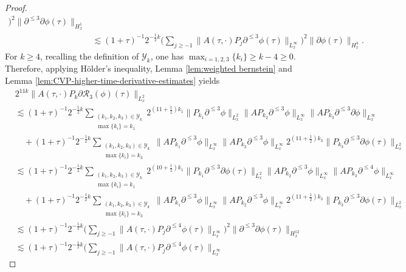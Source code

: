 \documentclass[11pt,twoside]{article}
\def\cY{\mathcal Y}
\def\p{\partial}
\def\ls{\lesssim}
\theoremstyle{plain}
\theoremstyle{definition}
\theoremstyle{assumption}
\numberwithin{equation}{section}
\begin{document}
\begin{proof}
\begin{equation}
\begin{aligned}
				\big)^2
				\|\p^{\le3}\p\phi(\tau)\|_{H^1_x}
				\\
				&\ls
				(1+\tau)^{-1}2^{-\frac12 k}
				\big(
				\sum_{j\ge-1}
				\|A(\tau,\cdot)P_j\p^{\le3}\phi(\tau)\|_{L^\infty_x}
				\big)^2
				\|\p\phi(\tau)\|_{H^4_x}.
			\end{aligned}
		\end{equation}
		For $k\ge 4$, recalling the definition of $\cY_k$, one has $\max_{i=1,2,3}\{k_i\}\ge k-4\ge 0$.
		Therefore, applying H\"older's inequality, Lemma \ref{lem:weighted bernstein} and Lemma \ref{lem:CVP-higher-time-derivative-estimates} yields
		\begin{equation}\label{eq:CVP-R3-high-frequency}
			\begin{aligned}
				&2^{11k}
				\|A(\tau,\cdot)P_k\p\mathcal R_3(\phi)(\tau)\|_{L^2_x}\\
				&\ls
				(1+\tau)^{-1}2^{-\frac12 k}
				\sum_{\substack{(k_1,k_2,k_3)\in\cY_k\\
						\max\{k_i\}=k_1}}
				2^{(11+\frac12)k_1}
				\|P_{k_1}\p^{\le3}\phi\|_{L^2_x}
				\|AP_{k_2}\p^{\le3}\phi\|_{L^\infty_x}
				\|AP_{k_3}\p^{\le3}\p\phi\|_{L^\infty_x}\\
				&\quad+
				(1+\tau)^{-1}2^{-\frac12 k}
				\sum_{\substack{(k_1,k_2,k_3)\in\cY_k\\
						\max\{k_i\}=k_3}}
				\|AP_{k_1}\p^{\le3}\phi\|_{L^\infty_x}
				\|AP_{k_2}\p^{\le3}\phi\|_{L^\infty_x}
				2^{(11+\frac12)k_3}
				\|P_{k_3}\p^{\le 3}\p\phi(\tau)\|_{L^2_x}\\
				&\ls
				(1+\tau)^{-1}2^{-\frac12 k}
				\sum_{\substack{(k_1,k_2,k_3)\in\cY_k\\
						\max\{k_i\}=k_1}}
				2^{(10+\frac12)k_1}
				\|P_{k_1}\p^{\le3}\p\phi(\tau)\|_{L^2_x}
				\|AP_{k_2}\p^{\le3}\phi\|_{L^\infty_x}
				\|AP_{k_3}\p^{\le4}\phi\|_{L^\infty_x}\\
				&\quad+
				(1+\tau)^{-1}2^{-\frac12 k}
				\sum_{\substack{(k_1,k_2,k_3)\in\cY_k\\
						\max\{k_i\}=k_3}}
				\|AP_{k_1}\p^{\le3}\phi\|_{L^\infty_x}
				\|AP_{k_2}\p^{\le3}\phi\|_{L^\infty_x}
				2^{(11+\frac12)k_3}
				\|P_{k_3}\p^{\le3}\p\phi(\tau)\|_{L^2_x}\\
				&\ls
				(1+\tau)^{-1}2^{-\frac12 k}
				\big(
				\sum_{j\ge-1}
				\|A(\tau,\cdot)P_j\p^{\le4}\phi(\tau)\|_{L^\infty_x}
				\big)^2
				\|\p^{\le 3}\p\phi(\tau)\|_{H^{12}_x}
				\\
				&\ls
				(1+\tau)^{-1}2^{-\frac12 k}
				\big(
				\sum_{j\ge-1}
				\|A(\tau,\cdot)P_j\p^{\le4}\phi(\tau)\|_{L^\infty_x}

\end{aligned}
\end{equation}
\end{proof}
\end{document}
